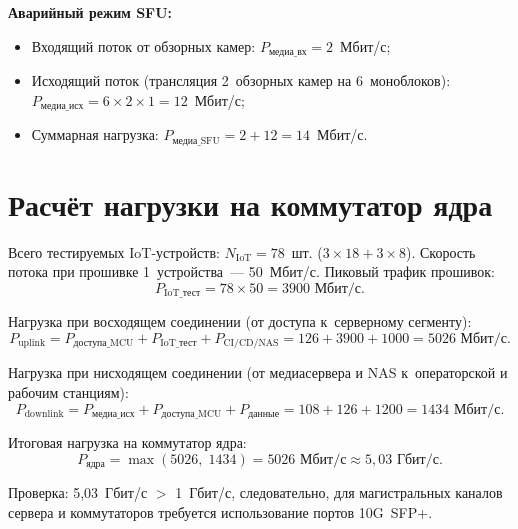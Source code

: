 \documentclass[a4paper,oneside,14pt]{extreport}
\begin{document}
\textbf{Аварийный режим SFU:}
\begin{itemize}
    \item Входящий поток от обзорных камер: $P_{\text{медиа\_вх}} = 2$~Мбит/с;
    \item Исходящий поток (трансляция 2~обзорных камер на 6~моноблоков): $P_{\text{медиа\_исх}} = 6 \times 2 \times 1 = 12$~Мбит/с;
    \item Суммарная нагрузка: $P_{\text{медиа\_SFU}} = 2 + 12 = 14$~Мбит/с.
\end{itemize}

\section{Расчёт нагрузки на коммутатор ядра}

Всего тестируемых IoT-устройств: $N_{\text{IoT}} = 78$~шт. ($3 \times 18 + 3 \times 8$). Скорость потока при прошивке 1~устройства~--- 50~Мбит/с. Пиковый трафик прошивок:
\begin{equation}
    P_{\text{IoT\_тест}} = 78 \times 50 = 3900 \text{ Мбит/с}.
    \label{eq:p_iot}
\end{equation}

Нагрузка при восходящем соединении (от доступа к~серверному сегменту):
\begin{equation}
    P_{\text{uplink}} = P_{\text{доступа\_MCU}} + P_{\text{IoT\_тест}} + P_{\text{CI/CD/NAS}} = 126 + 3900 + 1000 = 5026 \text{ Мбит/с}.
    \label{eq:p_uplink}
\end{equation}

Нагрузка при нисходящем соединении (от медиасервера и NAS к~операторской и рабочим станциям):
\begin{equation}
    P_{\text{downlink}} = P_{\text{медиа\_исх}} + P_{\text{доступа\_MCU}} + P_{\text{данные}} = 108 + 126 + 1200 = 1434 \text{ Мбит/с}.
    \label{eq:p_downlink}
\end{equation}

Итоговая нагрузка на коммутатор ядра:
\begin{equation}
    P_{\text{ядра}} = \max(5026,\; 1434) = 5026 \text{ Мбит/с} \approx 5{,}03 \text{ Гбит/с}.
    \label{eq:p_core}
\end{equation}

Проверка: 5,03~Гбит/с $>$ 1~Гбит/с, следовательно, для магистральных каналов сервера и коммутаторов требуется использование портов 10G~SFP+.

\end{document}
